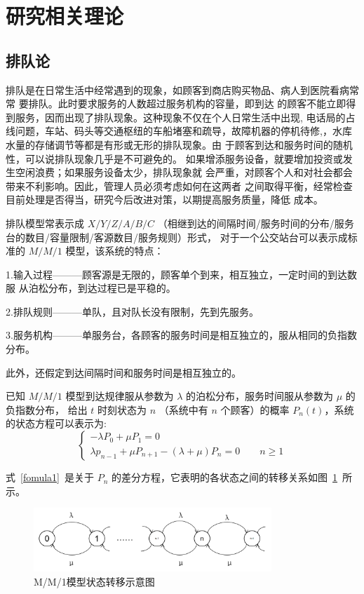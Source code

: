 \section{研究相关理论}
\subsection{排队论}
排队是在日常生活中经常遇到的现象，如顾客到商店购买物品、病人到医院看病常常
要排队。此时要求服务的人数超过服务机构的容量，即到达
的顾客不能立即得到服务，因而出现了排队现象。这种现象不仅在个人日常生活中出现,
电话局的占线问题，车站、码头等交通枢纽的车船堵塞和疏导，故障机器的停机待修,，水库
水量的存储调节等都是有形或无形的排队现象。由
于顾客到达和服务时间的随机性，可以说排队现象几乎是不可避免的。
如果增添服务设备，就要增加投资或发生空闲浪费；如果服务设备太少，排队现象就
会严重，对顾客个人和对社会都会带来不利影响。因此，管理人员必须考虑如何在这两者
之间取得平衡，经常检查目前处理是否得当，研究今后改进对策，以期提高服务质量，降低
成本\cite{ycx, jtgc}。

排队模型常表示成 $X/Y/Z/A/B/C$ （相继到达的间隔时间/服务时间的分布/服务台的数目/容量限制/客源数目/服务规则）形式，
对于一个公交站台可以表示成标准的 $M/M/1$ 模型，该系统的特点：

1.输入过程———顾客源是无限的，顾客单个到来，相互独立，一定时间的到达数服
从泊松分布，到达过程已是平稳的。

2.排队规则———单队，且对队长没有限制，先到先服务。

3.服务机构———单服务台，各顾客的服务时间是相互独立的，服从相同的负指数
分布。

此外，还假定到达间隔时间和服务时间是相互独立的。

已知 $M/M/1$ 模型到达规律服从参数为 $\lambda$ 的泊松分布，服务时间服从参数为 $\mu$ 的负指数分布，
给出 $t$ 时刻状态为 $n$ （系统中有 $n$ 个顾客）的概率 $P_{n}(t)$，系统的状态方程可以表示为:
\begin{equation}\label{fomula1}
    \begin{cases}
        -\lambda P_0 + \mu P_1 = 0
        \\
       \lambda p_{n - 1} + \mu P_{n + 1} - (\lambda + \mu)P_n = 0 \qquad n\ge 1
       \end{cases}
\end{equation}

式~\ref{fomula1}~是关于 $P_{n}$ 的差分方程，它表明的各状态之间的转移关系如图~\ref{fig21}~所示。

\begin{figure}[h]
\centering
\includegraphics[width=0.80\textwidth]{figs/chap02/fig21.png}
\caption{M/M/1模型状态转移示意图}
\label{fig21}
\end{figure}


